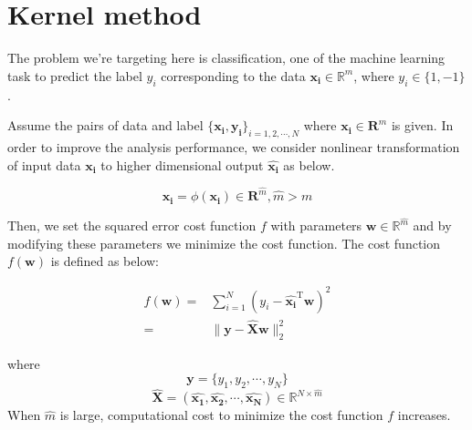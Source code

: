 \section{Kernel method}
\par The problem we're targeting here is classification, one of the machine learning task to predict the label $y_i$ corresponding to the data $\bm{x_i}\in \mathbb{R}^m$, where $y_i \in \{1, -1\}$.
\par Assume the pairs of data and label $\{\bm{x_i, y_i}\}_{i=1,2,\cdots,N}$ where $\bm{x_i}\in \mathbf{R}^m$ is given. In order to improve the analysis performance, we consider nonlinear transformation of input data $\bm{x_i}$ to higher dimensional output $\hat{\bm{x_i}}$ as below.

$$\hat{\bm{x_i}}=\phi (\bm{x_i})\in \mathbf{R}^{\hat{m}}, \hat{m}>m$$

Then, we set the squared error cost function $f$ with parameters $\bm{w}\in\mathbb{R}^{\hat{m}}$ and by modifying these parameters we minimize the cost function. The cost function $f(\bm{w})$ is defined as below:

\begin{equation}
\label{heavy}
\begin{aligned}
f(\bm{w})=&\sum_{i=1}^N (y_i-\hat{\bm{x_i}}^{ \mathrm{T} }\bm{w})^2\\
=& \|\bm{y}-\bm{\hat{X}}\bm{w}\|^2_2
\end{aligned}
\end{equation}

where
$$\bm{y}=\{y_1,y_2,\cdots,y_N\}$$
$$\hat{\bm{X}}=(\hat{\bm{x_1}},\hat{\bm{x_2}},\cdots,\hat{\bm{x_N}})\in\mathbb{R}^{N\times \hat{m}}
$$
When $\hat{m}$ is large, computational cost to minimize the cost function $f$ increases.

